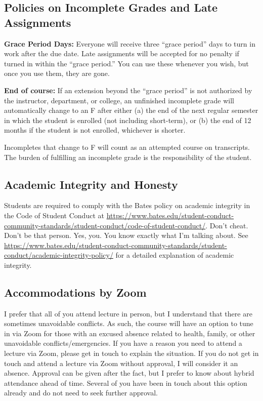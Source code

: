 \documentclass[11pt]{article}
\begin{document}
\subsection*{Policies on Incomplete Grades and Late Assignments}
\footnotesize{\textbf{Grace Period Days:} Everyone will receive three ``grace period'' days to turn in work after the due date. Late assignments will be accepted for no penalty if turned in within the ``grace period.'' You can use these whenever you wish, but once you use them, they are gone.}

\footnotesize{\textbf{End of course:} If an extension beyond the ``grace period'' is not authorized by the instructor, department, or college, an unfinished incomplete grade will automatically change to an F after either (a) the end of the next regular semester in which the student is enrolled (not including short-term), or (b) the end of 12 months if the student is not enrolled, whichever is shorter.}

\footnotesize{Incompletes that change to F will count as an attempted course on transcripts. The burden of fulfilling an incomplete grade is the responsibility of the student.}

\subsection*{Academic Integrity and Honesty}
\footnotesize{Students are required to comply with the Bates policy on academic integrity in the Code of Student Conduct at \url{https://www.bates.edu/student-conduct-community-standards/student-conduct/code-of-student-conduct/}. Don't cheat. Don't be that person. Yes, you. You know exactly what I'm talking about. See \url{https://www.bates.edu/student-conduct-community-standards/student-conduct/academic-integrity-policy/} for a detailed explanation of academic integrity.}

\subsection*{Accommodations by Zoom}
\footnotesize{I prefer that all of you attend lecture in person, but I understand that there are sometimes unavoidable conflicts. As such, the course will have an option to tune in via Zoom for those with an excused absence related to health, family, or other unavoidable conflicts/emergencies. If you have a reason you need to attend a lecture via Zoom, please get in touch to explain the situation. If you do not get in touch and attend a lecture via Zoom without approval, I will consider it an absence. Approval can be given after the fact, but I prefer to know about hybrid attendance ahead of time. Several of you have been in touch about this option already and do not need to seek further approval.}
\end{document}
